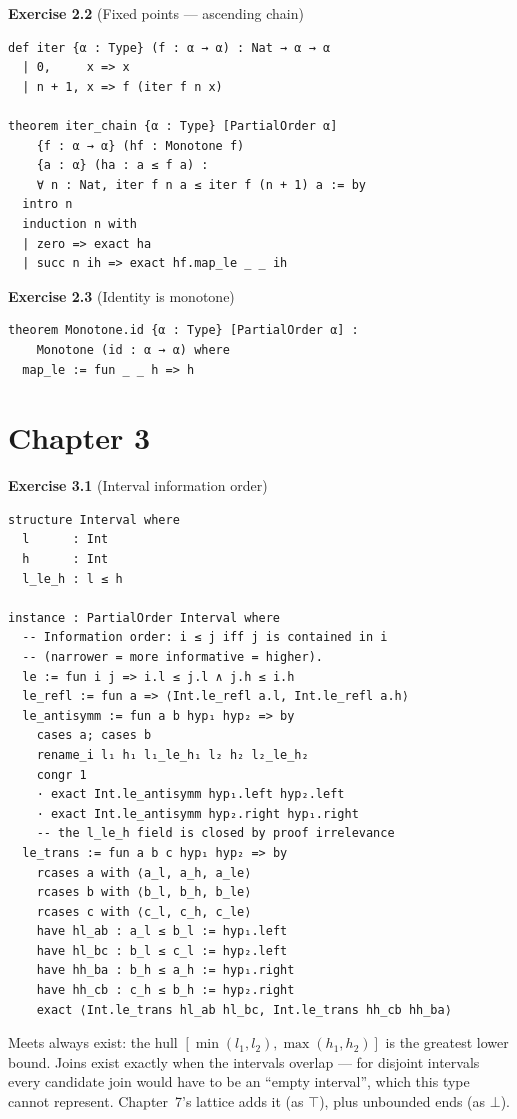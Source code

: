 \documentclass[12pt, a4paper, openright]{book}
\theoremstyle{thmstyle}
\theoremstyle{defstyle}
\begin{document}
\textbf{Exercise 2.2} (Fixed points --- ascending chain)

\begin{verbatim}
def iter {α : Type} (f : α → α) : Nat → α → α
  | 0,     x => x
  | n + 1, x => f (iter f n x)

theorem iter_chain {α : Type} [PartialOrder α]
    {f : α → α} (hf : Monotone f)
    {a : α} (ha : a ≤ f a) :
    ∀ n : Nat, iter f n a ≤ iter f (n + 1) a := by
  intro n
  induction n with
  | zero => exact ha
  | succ n ih => exact hf.map_le _ _ ih
\end{verbatim}

\textbf{Exercise 2.3} (Identity is monotone)

\begin{verbatim}
theorem Monotone.id {α : Type} [PartialOrder α] :
    Monotone (id : α → α) where
  map_le := fun _ _ h => h
\end{verbatim}

\section*{Chapter 3}

\textbf{Exercise 3.1} (Interval information order)

\begin{verbatim}
structure Interval where
  l      : Int
  h      : Int
  l_le_h : l ≤ h

instance : PartialOrder Interval where
  -- Information order: i ≤ j iff j is contained in i
  -- (narrower = more informative = higher).
  le := fun i j => i.l ≤ j.l ∧ j.h ≤ i.h
  le_refl := fun a => ⟨Int.le_refl a.l, Int.le_refl a.h⟩
  le_antisymm := fun a b hyp₁ hyp₂ => by
    cases a; cases b
    rename_i l₁ h₁ l₁_le_h₁ l₂ h₂ l₂_le_h₂
    congr 1
    · exact Int.le_antisymm hyp₁.left hyp₂.left
    · exact Int.le_antisymm hyp₂.right hyp₁.right
    -- the l_le_h field is closed by proof irrelevance
  le_trans := fun a b c hyp₁ hyp₂ => by
    rcases a with ⟨a_l, a_h, a_le⟩
    rcases b with ⟨b_l, b_h, b_le⟩
    rcases c with ⟨c_l, c_h, c_le⟩
    have hl_ab : a_l ≤ b_l := hyp₁.left
    have hl_bc : b_l ≤ c_l := hyp₂.left
    have hh_ba : b_h ≤ a_h := hyp₁.right
    have hh_cb : c_h ≤ b_h := hyp₂.right
    exact ⟨Int.le_trans hl_ab hl_bc, Int.le_trans hh_cb hh_ba⟩
\end{verbatim}

Meets always exist: the hull $[\min(l_1,l_2), \max(h_1,h_2)]$ is the
greatest lower bound. Joins exist exactly when the intervals overlap ---
for disjoint intervals every candidate join would have to be an ``empty
interval'', which this type cannot represent. Chapter~7's lattice adds it
(as $\top$), plus unbounded ends (as $\bot$).
\end{document}
